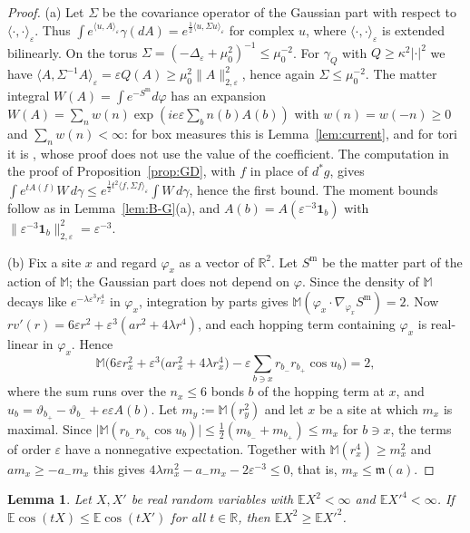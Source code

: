 \documentclass[11pt]{amsart}
\theoremstyle{plain}
\newtheorem{lemma}[theorem]{Lemma}
\theoremstyle{definition}
\theoremstyle{remark}
\numberwithin{equation}{section}
\newcommand{\R}{\mathbb{R}}
\newcommand{\eps}{\varepsilon}
\newcommand{\abs}[1]{\lvert #1\rvert}
\newcommand{\norm}[1]{\lVert #1\rVert}
\newcommand{\ip}[2]{\langle #1,#2\rangle}
\begin{document}
\begin{proof}
(a) Let $\Sigma$ be the covariance operator of the Gaussian part with respect to $\ip\cdot\cdot_\eps$. Thus $\int e^{\ip uA_\eps}\gamma(dA)=e^{\frac12\ip u{\Sigma u}_\eps}$ for complex $u$, where $\ip\cdot\cdot_\eps$ is extended bilinearly. On the torus $\Sigma=(-\Delta_\eps+\mu_0^2)^{-1}\le\mu_0^{-2}$. For $\gamma_Q$ with $Q\ge\kappa^2\abs\cdot^2$ we have $\ip A{\Sigma^{-1}A}_\eps=\eps Q(A)\ge\mu_0^2\norm A^2_{2,\eps}$, hence again $\Sigma\le\mu_0^{-2}$. The matter integral $W(A)=\int e^{-S^{\mathrm m}}d\varphi$ has an expansion $W(A)=\sum_nw(n)\exp(ie\eps\sum_bn(b)A(b))$ with $w(n)=w(-n)\ge0$ and $\sum_nw(n)<\infty$: for box measures this is Lemma~\ref{lem:current}, and for tori it is \cite[Lemma~2.5]{v1}, whose proof does not use the value of the coefficient. The computation in the proof of Proposition~\ref{prop:GD}, with $f$ in place of $d^*g$, gives $\int e^{tA(f)}W\,d\gamma\le e^{\frac12t^2\ip f{\Sigma f}_\eps}\int W\,d\gamma$, hence the first bound. The moment bounds follow as in Lemma~\ref{lem:B-G}(a), and $A(b)=A(\eps^{-3}\mathbf 1_b)$ with $\norm{\eps^{-3}\mathbf 1_b}^2_{2,\eps}=\eps^{-3}$.

(b) Fix a site $x$ and regard $\varphi_x$ as a vector of $\R^2$. Let $S^{\mathrm m}$ be the matter part of the action of $\mathbb M$; the Gaussian part does not depend on $\varphi$. Since the density of $\mathbb M$ decays like $e^{-\lambda\eps^3r_x^4}$ in $\varphi_x$, integration by parts gives $\mathbb M(\varphi_x\cdot\nabla_{\varphi_x}S^{\mathrm m})=2$. Now $rv'(r)=6\eps r^2+\eps^3(ar^2+4\lambda r^4)$, and each hopping term containing $\varphi_x$ is real-linear in $\varphi_x$. Hence
\[
\mathbb M\Big(6\eps r_x^2+\eps^3\big(ar_x^2+4\lambda r_x^4\big)-\eps\sum_{b\ni x}r_{b_-}r_{b_+}\cos u_b\Big)=2,
\]
where the sum runs over the $n_x\le6$ bonds $b$ of the hopping term at $x$, and $u_b=\vartheta_{b_+}-\vartheta_{b_-}+e\eps A(b)$. Let $m_y:=\mathbb M(r_y^2)$ and let $x$ be a site at which $m_x$ is maximal. Since $\abs{\mathbb M(r_{b_-}r_{b_+}\cos u_b)}\le\frac12(m_{b_-}+m_{b_+})\le m_x$ for $b\ni x$, the terms of order $\eps$ have a nonnegative expectation. Together with $\mathbb M(r_x^4)\ge m_x^2$ and $am_x\ge-a_-m_x$ this gives $4\lambda m_x^2-a_-m_x-2\eps^{-3}\le0$, that is, $m_x\le\mathfrak m(a)$.
\end{proof}

\begin{lemma}\label{lem:t2}
Let $X,X'$ be real random variables with $\mathbb E X^2<\infty$ and $\mathbb E X'^4<\infty$. If $\mathbb E\cos(tX)\le\mathbb E\cos(tX')$ for all $t\in\R$, then $\mathbb E X^2\ge\mathbb E X'^2$.
\end{lemma}
\end{document}
